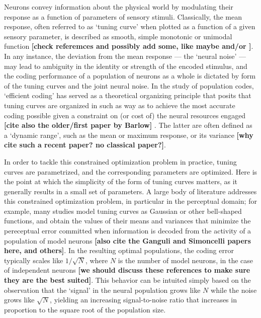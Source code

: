 \documentclass[a4paper]{article}%
\begin{document}
Neurons convey information about the physical world by modulating their
response as a function of parameters of sensory stimuli. Classically, the mean
response, often referred to as `tuning curve' when plotted as a function of a
given sensory parameter, is described as smooth, simple monotonic or unimodal
function
\cite{Hubel1959ReceptiveCortex,Georgopoulos1982OnCortex,Dayan2001TheoreticalSystems}
\textbf{[check referemces and possibly add some, like maybe
\cite{Hartley2014SpaceCognition,Mathis2012OptimalOf} and/or
\cite{Taube1990Head-directionAnalysis}]}. In any instance, the deviation from
the mean response --- the `neural noise' --- may lead to ambiguity in the
identity or strength of the encoded stimulus, and the coding performance of a
population of neurons as a whole is dictated by form of the tuning curves and
the joint neural noise. In the study of population codes, `efficient coding'
has served as a theoretical organizing principle that posits that tuning
curves are organized in such as way as to achieve the most accurate coding
possible given a constraint on (or cost of) the neural resources engaged
\textbf{[cite also the older/first paper by Barlow]}
\cite{Barlow2013PossibleMessages}. The latter are often defined as a `dynamic
range', such as the mean or maximum response, or its variance
\cite{Harel2020OptimalConstraints} \textbf{[why cite such a recent paper? no
classical paper?]}.

In order to tackle this constrained optimization problem in practice, tuning
curves are parametrized, and the corresponding parameters are optimized. Here
is the point at which the simplicity of the form of tuning curves matters, as
it generally results in a small set of parameters. A large body of literature
addresses this constrained optimization problem, in particular in the
perceptual domain; for example, many studies model tuning curves as Gaussian
or other bell-shaped functions, and obtain the values of their means and
variances that minimize the pereceptual error committed when information is
decoded from the activity of a population of model neurons
\cite{Zhang1999NeuronalBroaden,Deneve1999ReadingObservers,Pouget1999NarrowCode,Yaeli2010Error-basedNeurons,Fiscella2015VisualNeurons}
\textbf{[also cite the Ganguli and Simoncelli papers here, and others]}. In
the resulting optimal populations, the coding error typically scales like
$1/\sqrt{N}$, where $N$ is the number of model neurons, in the case of
independent neurons
\cite{Seung1993SimpleCodes,Berens2011ReassessingFunctions,Kim2020SuperlinearCodes}
\textbf{[we should discuss these references to make sure they are the best
suited]}. This behavior can be intuited simply based on the observation that
the `signal' in the neural population grows like $N$ while the noise grows
like $\sqrt{N}$, yielding an increasing signal-to-noise ratio that increases
in proportion to the square root of the population size.
\end{document}
